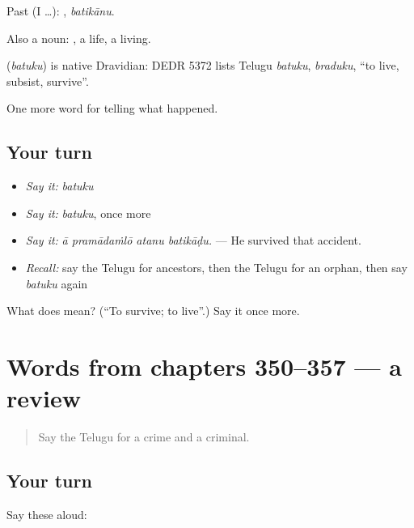 Past (I …): , \emph{batikānu}.

Also a noun: , a life, a living.

\begin{cousinweb}
\textbf{} (\emph{batuku}) is native Dravidian: DEDR 5372 lists Telugu \emph{batuku}, \emph{braduku}, \textquotedblleft{}to live, subsist, survive\textquotedblright{}.
\end{cousinweb}

\begin{grammarlens}[title={What you've built}]
One more word for telling what happened.
\end{grammarlens}

\subsection*{Your turn}
\begin{itemize}
\raggedright
  \item \emph{Say it:} \emph{batuku}
  \item \emph{Say it:} \emph{batuku}, once more
  \item \emph{Say it:} \emph{ā pramādaṁlō atanu batikāḍu.} — He survived that accident.
  \item \emph{Recall:} say the Telugu for ancestors, then the Telugu for an orphan, then say \emph{batuku} again
\end{itemize}

\begin{tcolorbox}[breakable,colback=teal!4,colframe=teal!35!black,title={Before you move on}]
What does  mean? (\textquotedblleft{}To survive; to live\textquotedblright{}.) Say it once more.
\end{tcolorbox}
\section[(dialogue)]{Words from chapters 350–357 — a review}

\label{lesson:TE-R357-review-350-357}



\begin{quote}
Say the Telugu for a crime and a criminal.
\end{quote}

\subsection*{Your turn}
Say these aloud:

